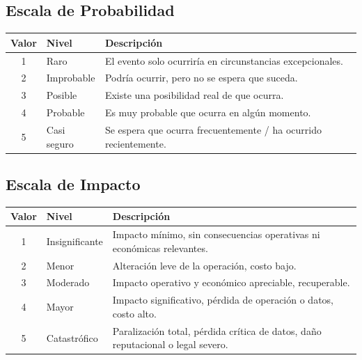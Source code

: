 \documentclass[11pt,a4paper]{article}
\begin{document}
\subsection{Escala de Probabilidad}

\begin{center}
\renewcommand{\arraystretch}{1.4}
\begin{tabularx}{\textwidth}{@{} c p{2.8cm} X @{}}
\toprule
\textbf{Valor} & \textbf{Nivel} & \textbf{Descripción} \\
\midrule
1 & Raro & El evento solo ocurriría en circunstancias excepcionales. \\
\midrule
2 & Improbable & Podría ocurrir, pero no se espera que suceda. \\
\midrule
3 & Posible & Existe una posibilidad real de que ocurra. \\
\midrule
4 & Probable & Es muy probable que ocurra en algún momento. \\
\midrule
5 & Casi seguro & Se espera que ocurra frecuentemente / ha ocurrido recientemente. \\
\bottomrule
\end{tabularx}
\end{center}

\subsection{Escala de Impacto}

\begin{center}
\renewcommand{\arraystretch}{1.4}
\begin{tabularx}{\textwidth}{@{} c p{2.8cm} X @{}}
\toprule
\textbf{Valor} & \textbf{Nivel} & \textbf{Descripción} \\
\midrule
1 & Insignificante & Impacto mínimo, sin consecuencias operativas ni económicas relevantes. \\
\midrule
2 & Menor & Alteración leve de la operación, costo bajo. \\
\midrule
3 & Moderado & Impacto operativo y económico apreciable, recuperable. \\
\midrule
4 & Mayor & Impacto significativo, pérdida de operación o datos, costo alto. \\
\midrule
5 & Catastrófico & Paralización total, pérdida crítica de datos, daño reputacional o legal severo. \\
\bottomrule
\end{tabularx}
\end{center}
\end{document}
